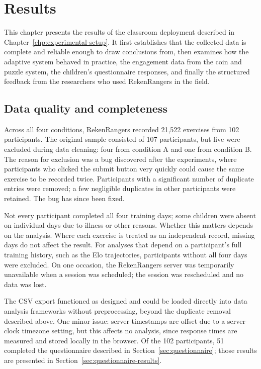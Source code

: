 \chapter{Results}
\label{chp:results}
This chapter presents the results of the classroom deployment described in Chapter~\ref{chp:experimental-setup}. It first establishes that the collected data is complete and reliable enough to draw conclusions from, then examines how the adaptive system behaved in practice, the engagement data from the coin and puzzle system, the children's questionnaire responses, and finally the structured feedback from the researchers who used RekenRangers in the field.

\section{Data quality and completeness}
\label{sec:data-quality}
Across all four conditions, RekenRangers recorded 21,522 exercises from 102 participants. The original sample consisted of 107 participants, but five were excluded during data cleaning: four from condition A and one from condition B. The reason for exclusion was a bug discovered after the experiments, where participants who clicked the submit button very quickly could cause the same exercise to be recorded twice. Participants with a significant number of duplicate entries were removed; a few negligible duplicates in other participants were retained. The bug has since been fixed.

Not every participant completed all four training days; some children were absent on individual days due to illness or other reasons. Whether this matters depends on the analysis. Where each exercise is treated as an independent record, missing days do not affect the result. For analyses that depend on a participant's full training history, such as the Elo trajectories, participants without all four days were excluded. On one occasion, the RekenRangers server was temporarily unavailable when a session was scheduled; the session was rescheduled and no data was lost.

The CSV export functioned as designed and could be loaded directly into data analysis frameworks without preprocessing, beyond the duplicate removal described above. One minor issue: server timestamps are offset due to a server-clock timezone setting, but this affects no analysis, since response times are measured and stored locally in the browser. Of the 102 participants, 51 completed the questionnaire described in Section~\ref{sec:questionnaire}; those results are presented in Section~\ref{sec:questionnaire-results}.

